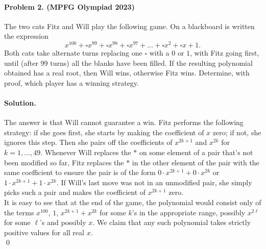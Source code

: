 \documentclass[12pt]{article}
\newenvironment{solution}
{\paragraph{Solution.}}
{\qed\eject}
\begin{document}
\paragraph{\textbf{Problem 2. (MPFG Olympiad 2023)}} The two cats Fitz and Will play the following game. On a blackboard is written the expression
\[ 
  x^{100} + {\square} x^{99} + {\square} x^{98} + {\square} x^{97} + \dots + {\square } x^2 + {\square} x +1. 
\]Both cats take alternate turns replacing one $\square$ with a $0$ or $1$, with Fitz going first, until (after 99 turns) all the blanks have been filled. If the resulting polynomial obtained has a real root, then Will wins, otherwise Fitz wins. Determine, with proof, which player has a winning strategy.

\begin{solution}
    The answer is that Will cannot guarantee a win. Fitz performs the following strategy: if she goes first, she starts by making the coefficient of $x$ zero; if not, she ignores this step. Then she pairs off the coefficients of $x^{2k+1}$ and $x^{2k}$ for $k=1,\ldots, 49$. Whenever Will replaces the $\ast$ on some element of a pair that's not been modified so far, Fitz replaces the $\ast$ in the other element of the pair with the same coefficient to ensure the pair is of the form $0\cdot x^{2k+1}+0\cdot x^{2k}$ or $1\cdot x^{2k+1}+1\cdot x^{2k}$. If Will's last move was not in an unmodified pair, she simply picks such a pair and makes the coefficient of $x^{2k+1}$ zero.\\

    It is easy to see that at the end of the game, the polynomial would consist only of the terms $x^{100}$, $1$, $x^{2k+1}+x^{2k}$ for some $k$'s in the appropriate range, possibly $x^{2\ell}$ for some $\ell$'s and possibly $x$. We claim that any such polynomial takes strictly positive values for all real $x$.\\


\end{solution}
\end{document}
